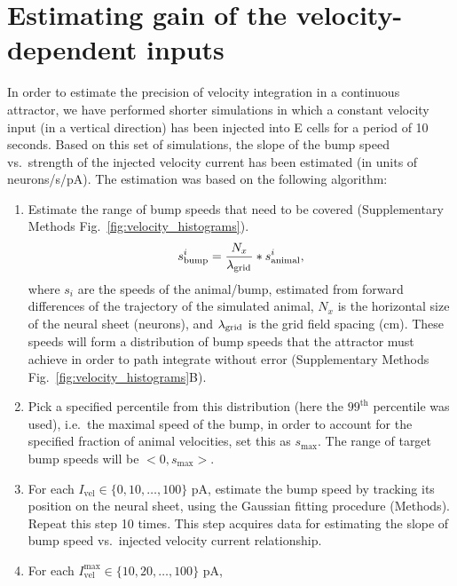 \documentclass[a4paper,12pt]{article}
\newcommand{\ssc}[3]{\ensuremath{#1_{\text{#2}_{\text{#3}}}}}
\newcommand{\lamgrid}{\ssc{\lambda}{\scriptsize{grid}}{}}
\begin{document}

\section{Estimating gain of the velocity-dependent inputs} \label{sec:gain_est}

In order to estimate the precision of velocity integration in a continuous
attractor, we have performed shorter simulations in which a constant velocity
input (in a vertical direction) has been injected into E cells for a period of 10
seconds. Based on this set of simulations, the slope of the bump speed vs.\ 
strength of the injected velocity current has been estimated (in units of
neurons/s/pA).  The estimation was based on the following algorithm:
\begin{enumerate}
    \item Estimate the range of bump speeds that need to be covered
        (Supplementary Methods Fig.~\ref{fig:velocity_histograms}).
        \begin{equation}
        s_{\text{bump}}^i =
        \frac{N_x}{\lamgrid}*s_{\text{animal}}^i,
        \label{eq:bump_speeds}
        \end{equation}
        where $s_{i}$ are the speeds of the animal/bump, estimated from forward
        differences of the trajectory of the simulated animal, $N_x$ is the
        horizontal size of the neural sheet (neurons), and $\lamgrid$ is the grid
        field spacing (cm).  These speeds will form a distribution of bump
        speeds that the attractor must achieve in order to path integrate
        without error (Supplementary Methods Fig.~\ref{fig:velocity_histograms}B).
    \item Pick a specified percentile from this distribution (here the
        $99^\text{th}$ percentile was used), i.e.\ the maximal speed of the
        bump, in order to account for the specified fraction of animal
        velocities, set this as $s_{\text{max}}$. The range of target bump
        speeds will be $<0, s_{\text{max}}>$.
    \item For each $I_{\text{vel}} \in \{0, 10, \dots, 100\}$ pA, estimate the
        bump speed by tracking its position on the neural sheet, using the
        Gaussian fitting procedure (Methods). Repeat this step 10 times. This
        step acquires data for estimating the slope of bump speed vs.\ injected
        velocity
        current relationship.
    \item For each $I_{\text{vel}}^{\text{max}} \in \{10, 20, \dots, 100\}$ pA,

\end{enumerate}
\end{document}
